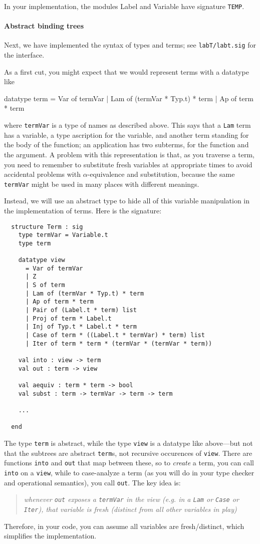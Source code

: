 \documentclass[11pt]{article}
\newcommand\sml[1]{\texttt{#1}}
\begin{document}
In your implementation, the modules Label and Variable have signature
\texttt{TEMP}.

\paragraph{Abstract binding trees}  Next, we have implemented the
syntax of types and terms; see \sml{labT/labt.sig} for the interface.  

As a first cut, you might expect that we would represent terms with a datatype
like
\begin{code}
    datatype term
      = Var of termVar
      | Lam of (termVar * Typ.t) * term
      | Ap of term * term
\end{code}
where \texttt{termVar} is a type of names as described above.  This says
that a \texttt{Lam} term has a variable, a type ascription for the
variable, and another term standing for the body of the function; an
application has two subterms, for the function and the argument.  A
problem with this representation is that, as you traverse a term, you
need to remember to substitute fresh variables at appropriate times to
avoid accidental problems with $\alpha$-equivalence and substitution,
because the same \texttt{termVar} might be used in many places with
different meanings.

Instead, we will use an abstract type to hide all of this variable
manipulation in the implementation of terms.  Here is the signature:

\begin{verbatim}
  structure Term : sig
    type termVar = Variable.t
    type term

    datatype view
      = Var of termVar
      | Z
      | S of term
      | Lam of (termVar * Typ.t) * term
      | Ap of term * term
      | Pair of (Label.t * term) list
      | Proj of term * Label.t
      | Inj of Typ.t * Label.t * term
      | Case of term * ((Label.t * termVar) * term) list
      | Iter of term * term * (termVar * (termVar * term))

    val into : view -> term
    val out : term -> view

    val aequiv : term * term -> bool
    val subst : term -> termVar -> term -> term

    ... 

  end
\end{verbatim}

The type \sml{term} is abstract, while the type \sml{view} is a datatype
like above---but not that the subtrees are abstract \sml{term}s, not
recursive occurences of \sml{view}.  There are functions \sml{into} and
\sml{out} that map between these, so to \emph{create} a term, you can
call \sml{into} on a \sml{view}, while to case-analyze a term (as you
will do in your type checker and operational semantics), you call
\sml{out}.  The key idea is:
\begin{quote}
\emph{whenever \sml{out} exposes a \sml{termVar} in the view (e.g. in a
  \sml{Lam} or \sml{Case} or \sml{Iter}), that variable is \emph{fresh}
  (distinct from all other variables in play)}
\end{quote}
Therefore, in your code, you can assume all variables are
fresh/distinct, which simplifies the implementation.  
\end{document}
